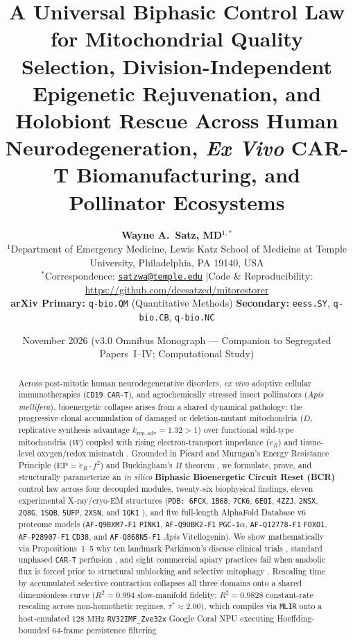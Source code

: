 \documentclass[11pt]{article}
\title{\LARGE\textbf{A Universal Biphasic Control Law for Mitochondrial Quality Selection, Division-Independent Epigenetic Rejuvenation, and Holobiont Rescue Across Human Neurodegeneration, \textit{Ex Vivo} CAR-T Biomanufacturing, and Pollinator Ecosystems}}
\author{
  \textbf{Wayne A.~Satz, MD}$^{1,*}$ \\[0.35em]
  {\small $^{1}$Department of Emergency Medicine, Lewis Katz School of Medicine at Temple University, Philadelphia, PA 19140, USA} \\
  {\small $^{*}$Correspondence: \href{mailto:satzwa@temple.edu}{\texttt{satzwa@temple.edu}} \quad$\vert$\quad Code \& Reproducibility: \url{https://github.com/deesatzed/mitorestorer}} \\
  {\small \textbf{arXiv Primary:} \texttt{q-bio.QM} (Quantitative Methods) \quad \textbf{Secondary:} \texttt{eess.SY}, \texttt{q-bio.CB}, \texttt{q-bio.NC}}
}
\date{\small November 2026 \quad (v3.0 Omnibus Monograph --- Companion to Segregated Papers~I--IV; Computational Study)}
\begin{document}
\maketitle

\begin{abstract}
\noindent Across post-mitotic human neurodegenerative disorders, \textit{ex vivo} adoptive cellular immunotherapies (\texttt{CD19 CAR-T}), and agrochemically stressed insect pollinators (\textit{Apis mellifera}), bioenergetic collapse arises from a shared dynamical pathology: the progressive clonal accumulation of damaged or deletion-mutant mitochondria ($D$, replicative synthesis advantage $k_{\mathrm{rep,adv}} = 1.32 > 1$) over functional wild-type mitochondria ($W$) \cite{stewart2015purifying,aryaman2019stochastic,wallace2012mitochondrial} coupled with rising electron-transport impedance ($\dot{e}_R$) and tissue-level oxygen/redox mismatch \cite{marutani2025hypoxia}. Grounded in Picard and Murugan's Energy Resistance Principle ($\mathrm{EP} = \dot{e}_R \cdot f^2$) \cite{picard2025energy} and Buckingham's $\Pi$ theorem \cite{buckingham1914physically}, we formulate, prove, and structurally parameterize an \textit{in silico} \textbf{Biphasic Bioenergetic Circuit Reset (BCR)} control law across four decoupled modules, twenty-six biophysical findings, eleven experimental X-ray/cryo-EM structures (\texttt{PDB: 6FCX}, \texttt{1B68}, \texttt{7CK6}, \texttt{6EQI}, \texttt{4ZZJ}, \texttt{2NSX}, \texttt{2Q8G}, \texttt{1SQB}, \texttt{5UFP}, \texttt{2XSN}, and \texttt{1QK1} \cite{froese2018mthfr,dong2001apoe4,wang2020tomm40,schubert2017pink1,dai2015sirt1,lieberman2007gba1,kato2007pdk1,esser2006bc1,wallace2016hif2a,muniz2011th,eder2000umtck}), and five full-length AlphaFold Database v6 \cite{jumper2021alphafold,varadi2024afdb} proteome models (\texttt{AF-Q9BXM7-F1} \texttt{PINK1}, \texttt{AF-Q9UBK2-F1} \texttt{PGC-1$\alpha$}, \texttt{AF-Q12778-F1} \texttt{FOXO1}, \texttt{AF-P28907-F1} \texttt{CD38}, and \texttt{AF-Q868N5-F1} \textit{Apis} Vitellogenin). We show mathematically via Propositions~1--5 why ten landmark Parkinson's disease clinical trials \cite{qe32014coq10,netpd2015creatine,surepd32021inosine,steadypd2020isradipine,devos2022fairpark,fszone2015pioglitazone,brakedal2022nadpark,mullin2020ambroxol,payne2023udca,meissner2024lixipark}, standard unphased \texttt{CAR-T} perfusion \cite{fraietta2018determinants,sukumar2013inhibiting,buck2016mitochondrial,doan2024foxo1,denk2025mitoimmune}, and eight commercial apiary practices \cite{degrandi2015fungicides,bartlett2002strobilurin,mao2013pcoumaric,leonard2020salvi,spannhoff2011hda,seehuus2006bee,leipart2022vitellogenin,havukainen2013vitellogenin} fail when anabolic flux is forced prior to structural unblocking and selective mitophagy \cite{ryu2016urolithin}. Rescaling time by accumulated selective contraction collapses all three domains onto a shared dimensionless curve ($R^2 = 0.994$ slow-manifold fidelity; $R^2 = 0.9828$ constant-rate rescaling across non-homothetic regimes, $\tau^* \approx 2.00$), which compiles via \texttt{MLIR} \cite{lattner2021mlir} onto a host-emulated $128\text{ MHz}$ \texttt{RV32IMF\_Zve32x} Google Coral NPU \cite{waterman2014riscv} executing Hoeffding-bounded 64-frame persistence filtering 
\end{abstract}
\end{document}
